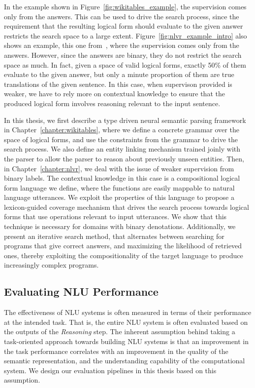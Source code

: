 In the example shown in Figure~\ref{fig:wikitables_example}, the supervision comes only from the
answers. This can be used to drive the search process, since the requirement that the resulting
logical form should evaluate to the given answer restricts the search space to a large extent.
Figure~\ref{fig:nlvr_example_intro} also shows an example, this one
from~\cite{suhr2017corpus}, where the supervision comes only from the
answers. However, since the answers are binary, they do not restrict the search space as much. In
fact, given a space of valid logical forms, exactly 50\% of them evaluate to the given answer, but
only a minute proportion of them are true translations of the given sentence. In this case, when
supervison provided is weaker, we have to rely more on contextual knowledge to ensure that the
produced logical form involves reasoning relevant to the input sentence.

In this thesis, we first describe a type driven neural semantic parsing framework in
Chapter~\ref{chapter:wikitables}, where we define a concrete grammar over the space of logical
forms, and use the constraints from the grammar to drive the search process. We also define an
entity linking mechanism trained joinly with the parser to allow the parser to reason about
previously unseen entities. Then, in Chapter~\ref{chapter:nlvr}, we deal with the issue of weaker
supervision from binary labels. The contextual knowledge in this case is a compositional logical
form language we define, where the functions are easily mappable to natural language utterances. We
exploit the properties of this language to propose a lexicon-guided coverage mechanism that drives
the search process towards logical forms that use operations relevant to input utterances.  We show
that this technique is necessary for domains with binary denotations. Additionally, we present an
iterative search method, that alternates between searching for programs that give correct answers,
and maximizing the likelihood of retrieved ones, thereby exploiting the compositionality of the
target language to produce increasingly complex programs. 

\subsection{Evaluating NLU Performance} The effectiveness of NLU systems is often measured in terms
of their performance at the intended task. That is, the entire NLU system is often evaluated based on the
outputs of the \textit{Reasoning} step. The inherent assumption behind taking a task-oriented
approach towards building NLU systems is that an improvement in the task performance correlates with
an improvement in the quality of the semantic representation, and the understanding capability of
the computational system.  We design our evaluation pipelines in this thesis based on this
assumption.

